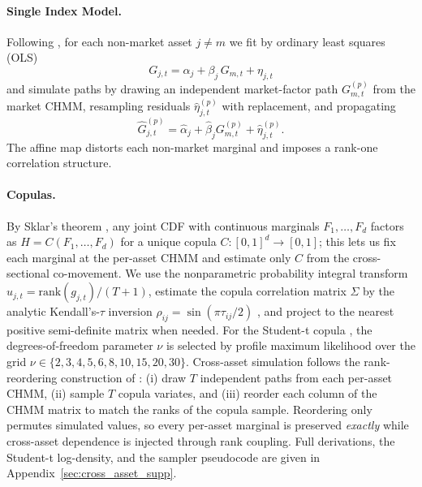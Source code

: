 \paragraph{Single Index Model.}
Following \citet{sharpe1963simplified}, for each non-market asset $j \neq m$ we fit by ordinary least squares (OLS)
\begin{equation}
    G_{j,t} = \alpha_j + \beta_j\, G_{m,t} + \eta_{j,t}
    \label{eq:sim}
\end{equation}
and simulate paths by drawing an independent market-factor path $G_{m,t}^{(p)}$ from the market CHMM, resampling residuals $\hat{\eta}_{j,t}^{(p)}$ with replacement, and propagating
\begin{equation}
    \hat{G}_{j,t}^{(p)} = \hat\alpha_j + \hat\beta_j G_{m,t}^{(p)} + \hat\eta_{j,t}^{(p)}.
    \label{eq:sim_sim}
\end{equation}
The affine map distorts each non-market marginal and imposes a rank-one correlation structure.

\paragraph{Copulas.}
By Sklar's theorem \cite{sklar1959fonctions}, any joint CDF with continuous marginals $F_1, \dots, F_d$ factors as $H = C(F_1, \dots, F_d)$ for a unique copula $C : [0, 1]^d \to [0, 1]$; this lets us fix each marginal at the per-asset CHMM and estimate only $C$ from the cross-sectional co-movement.
We use the nonparametric probability integral transform $u_{j, t} = \text{rank}(g_{j, t}) / (T + 1)$, estimate the copula correlation matrix $\Sigma$ by the analytic Kendall's-$\tau$ inversion $\rho_{ij} = \sin(\pi \tau_{ij} / 2)$ \cite{embrechts2002correlation, mcneil2015quantitative}, and project to the nearest positive semi-definite matrix when needed.
For the Student-t copula \cite{demarta2005tcopula}, the degrees-of-freedom parameter $\nu$ is selected by profile maximum likelihood over the grid $\nu \in \{2, 3, 4, 5, 6, 8, 10, 15, 20, 30\}$.
Cross-asset simulation follows the rank-reordering construction of \citet{iman1982distribution}: (i) draw $T$ independent paths from each per-asset CHMM, (ii) sample $T$ copula variates, and (iii) reorder each column of the CHMM matrix to match the ranks of the copula sample.
Reordering only permutes simulated values, so every per-asset marginal is preserved \emph{exactly} while cross-asset dependence is injected through rank coupling.
Full derivations, the Student-t log-density, and the sampler pseudocode are given in Appendix~\ref{sec:cross_asset_supp}.

